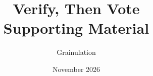 \documentclass[11pt]{article}
\title{Verify, Then Vote\\Supporting Material}
\author{Grainulation}
\date{November 2026}
\begin{document}
\maketitle

\begingroup
\makeatletter
\let\original@section\l@section
\renewcommand{\l@section}[2]{\begingroup\renewcommand{\numberline}[1]{\hb@xt@2em{##1\hfil}}\original@section{#1}{#2}\endgroup}
\makeatother
\tableofcontents
\endgroup
\clearpage












\end{document}
